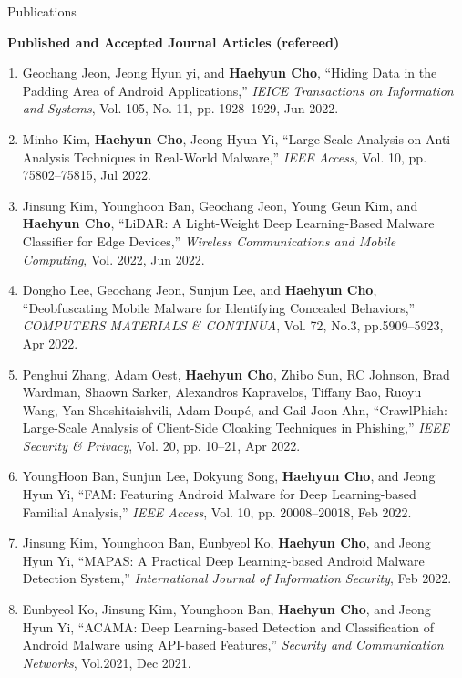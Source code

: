 \documentclass{resume} %
\begin{document}
\begin{rSection}{\faGenderless~Publications}
	\vspace{3mm}
\newpage	
    \strut\textbullet~{\bf Published and Accepted Journal Articles (refereed)}
    \begin{enumerate}[leftmargin=0pt]
		\item Geochang Jeon, Jeong Hyun yi, and \textbf{Haehyun Cho}, 
		``Hiding Data in the Padding Area of Android Applications,''
		\emph{IEICE Transactions on Information and Systems},
		Vol. 105, No. 11, pp. 1928--1929, Jun 2022.

		\item Minho Kim, \textbf{Haehyun Cho}, Jeong Hyun Yi, 
		``Large-Scale Analysis on Anti-Analysis Techniques in Real-World Malware,''
		\emph{IEEE Access}, 
		Vol. 10,  pp. 75802--75815, Jul 2022.

		\item Jinsung Kim, Younghoon Ban, Geochang Jeon, Young Geun Kim, and \textbf{Haehyun Cho}, 
		``LiDAR: A Light-Weight Deep Learning-Based Malware Classifier for Edge Devices,''
		\emph{Wireless Communications and Mobile Computing}, 
		Vol. 2022, Jun 2022.

		\item Dongho Lee, Geochang Jeon, Sunjun Lee, and \textbf{Haehyun Cho},
		``Deobfuscating Mobile Malware for Identifying Concealed Behaviors,''
		\emph{COMPUTERS MATERIALS \& CONTINUA}, 
		Vol. 72, No.3, pp.5909--5923, Apr 2022.
		
		\item Penghui Zhang, Adam Oest, \textbf{Haehyun Cho}, Zhibo Sun, RC Johnson, Brad Wardman, Shaown Sarker, Alexandros Kapravelos, Tiffany Bao, Ruoyu Wang, Yan Shoshitaishvili, Adam Doup\'e, and Gail-Joon Ahn,
		``CrawlPhish: Large-Scale Analysis of Client-Side Cloaking Techniques in Phishing,''
		\emph{IEEE Security \& Privacy}, 
		Vol. 20, pp. 10--21, Apr 2022. 

		\item YoungHoon Ban, Sunjun Lee, Dokyung Song, \textbf{Haehyun Cho}, and Jeong Hyun Yi,
		``FAM: Featuring Android Malware for Deep Learning-based Familial Analysis,'' 
		\emph{IEEE Access}, 
		Vol. 10, pp. 20008--20018, Feb 2022.
		
		\item Jinsung Kim, Younghoon Ban, Eunbyeol Ko, \textbf{Haehyun Cho}, and Jeong Hyun Yi,
		``MAPAS: A Practical Deep Learning-based Android Malware Detection System,''
		\emph{International Journal of Information Security}, 
		Feb 2022.
		
		\item Eunbyeol Ko, Jinsung Kim, Younghoon Ban, \textbf{Haehyun Cho}, and Jeong Hyun Yi, 
		``ACAMA: Deep Learning-based Detection and Classification of Android Malware using API-based Features,''
		\emph{Security and Communication Networks}, 
		Vol.2021, Dec 2021.
		

\end{enumerate}
\end{rSection}
\end{document}
